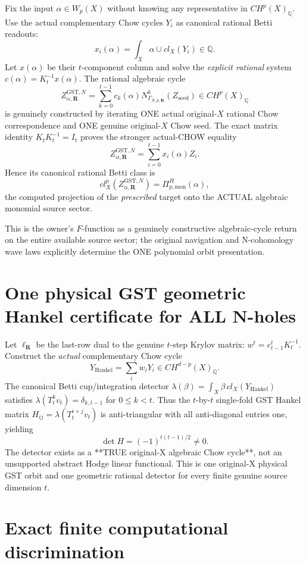 \documentclass[11pt]{article}
\begin{document}
Fix the input $\alpha\in W_p(X)$ without knowing
any representative in $CH^p(X)_{\mathbb Q}$.
Use the actual complementary Chow cycles
$Y_i$ as canonical rational Betti readouts:
\[
x_i(\alpha)=\int_X\alpha\cup cl_X(Y_i)\in\mathbb Q.
\]
Let $x(\alpha)$ be their $t$-component column
and solve the \emph{explicit rational} system
$c(\alpha)=K_t^{-1}x(\alpha)$.
The rational algebraic cycle
\[
\boxed{
Z_{\alpha,\mathbf R}^{\mathrm{GST},N}
=
\sum_{k=0}^{t-1}c_k(\alpha)
N_{\Gamma_{X,p,\mathbf R}}^k(Z_{\mathrm{seed}})
\in CH^p(X)_{\mathbb Q}
}
\]
is genuinely constructed by iterating ONE actual
original-$X$ rational Chow correspondence and
ONE genuine original-$X$ Chow seed.
The exact matrix identity $K_tK_t^{-1}=I_t$
proves the stronger actual-CHOW equality
\[
Z_{\alpha,\mathbf R}^{\mathrm{GST},N}
=\sum_{i=0}^{t-1}x_i(\alpha)Z_i.
\]
Hence its canonical rational Betti class is
\[
\boxed{
cl_X^p(Z_{\alpha,\mathbf R}^{\mathrm{GST},N})
=\Pi_{p,\mathrm{mon}}^H(\alpha),
}
\]
the computed projection of the \emph{prescribed}
target onto the ACTUAL algebraic monomial source sector.

This is the owner's $F$-function as a genuinely
constructive algebraic-cycle return on the
entire available source sector; the original
navigation and N-cohomology wave laws explicitly
determine the ONE polynomial orbit presentation.

\section{One physical GST geometric Hankel certificate for ALL N-holes}

Let $\ell_{\mathbf R}$ be the last-row dual
to the genuine $t$-step Krylov matrix:
$w^t=e_{t-1}^tK_t^{-1}$.
Construct the \emph{actual} complementary Chow cycle
\[
\boxed{
Y_{\mathrm{Hankel}}=\sum_iw_iY_i
\in CH^{d-p}(X)_{\mathbb Q}.
}
\]
The canonical Betti cup/integration detector
$\lambda(\beta)=\int_X\beta\,cl_X(Y_{\mathrm{Hankel}})$
satisfies
$\lambda(T_t^kv_t)=\delta_{k,t-1}$
for $0\le k<t$.
Thus the $t$-by-$t$ single-fold
GST Hankel matrix
$H_{ij}=\lambda(T_t^{i+j}v_t)$
is anti-triangular with all anti-diagonal
entries one, yielding
\[
\boxed{
\det H=(-1)^{t(t-1)/2}\ne0.
}
\]
The detector exists as a **TRUE original-X
algebraic Chow cycle**, not an unsupported
abstract Hodge linear functional. This is
one original-X physical GST orbit and
one geometric rational detector for every
finite genuine source dimension $t$.

\section{Exact finite computational discrimination}
\end{document}
